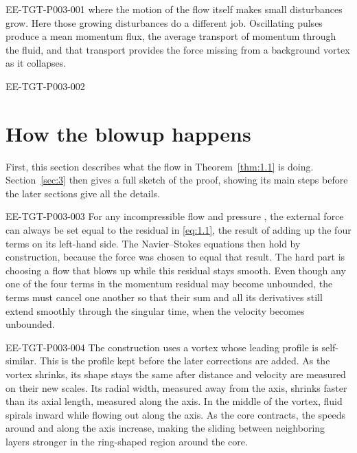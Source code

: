 %
\begin{EESegment}{EE-TGT-P003-001}
where the motion of the flow itself makes small disturbances grow. Here those growing
disturbances do a different job. Oscillating pulses produce a mean momentum flux, the average
transport of momentum through the fluid, and that transport provides the force missing from a
background vortex as it collapses.
\end{EESegment}

\begin{EESegment}{EE-TGT-P003-002}
\section{How the blowup happens}\label{sec:2}

First, this section describes what the flow in Theorem~\ref{thm:1.1} is doing. Section~\ref{sec:3}
then gives a full sketch of the proof, showing its main steps before the later sections give all
the details.
\end{EESegment}

\begin{EESegment}{EE-TGT-P003-003}
For any incompressible flow  and pressure
, the external force  can always be set equal to the
residual in \eqref{eq:1.1}, the result of adding up the four terms on its left-hand side. The
Navier--Stokes equations then hold by construction, because the force was chosen to equal that
result. The hard part is choosing a flow that blows up while this residual stays smooth.
Even though any one of the four terms in the momentum residual may become unbounded, the terms
must cancel one another so that their sum and all its derivatives still extend smoothly through
the singular time, when the velocity becomes unbounded.
\end{EESegment}

\begin{EESegment}{EE-TGT-P003-004}
The construction uses a vortex whose leading profile is self-similar. This is the profile kept
before the later corrections are added. As the vortex shrinks, its shape stays the same after
distance and velocity are measured on their new scales. Its radial width, measured away from
the axis, shrinks faster than its axial length, measured along the axis. In the middle of the vortex, fluid
spirals inward while flowing out along the axis. As the core contracts, the speeds around and
along the axis increase, making the sliding between neighboring layers stronger in the
ring-shaped region around the core.
\end{EESegment}


